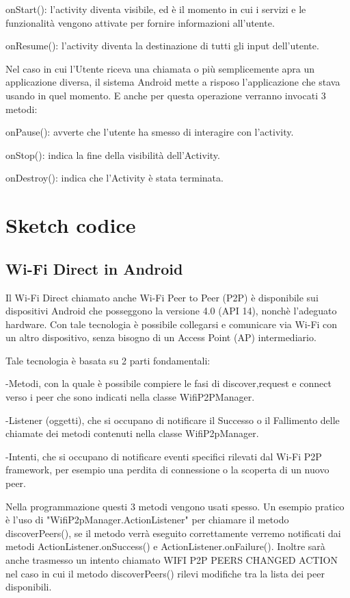 onStart(): l'activity diventa visibile, ed è il momento in cui i servizi e le funzionalità vengono attivate per fornire informazioni all'utente.

onResume(): l'activity diventa la destinazione di tutti gli input dell'utente.

Nel caso in cui l'Utente riceva una chiamata o più semplicemente apra un applicazione diversa, il sistema Android mette a risposo l'applicazione che stava usando in quel momento.
E anche per questa operazione verranno invocati 3 metodi:

onPause(): avverte che l'utente ha smesso di interagire con l'activity.

onStop(): indica la fine della visibilità dell'Activity.

onDestroy(): indica che l'Activity è stata terminata.

\section{Sketch codice}

\subsection{Wi-Fi Direct in Android}

Il Wi-Fi Direct chiamato anche Wi-Fi Peer to Peer (P2P) è disponibile sui dispositivi Android che posseggono la versione 4.0 (API 14), nonchè l'adeguato hardware.
Con tale tecnologia è possibile collegarsi e comunicare via Wi-Fi con un altro dispositivo, senza bisogno di un Access Point (AP) intermediario.

Tale tecnologia è basata su 2 parti fondamentali:

-Metodi, con la quale è possibile compiere le fasi di discover,request e connect verso i peer che sono indicati nella classe WifiP2PManager.

-Listener (oggetti), che si occupano di notificare il Successo o il Fallimento delle chiamate dei metodi contenuti nella classe WifiP2pManager.

-Intenti, che si occupano di notificare eventi specifici rilevati dal Wi-Fi P2P framework, per esempio una perdita di connessione o la scoperta di un nuovo peer.

Nella programmazione questi 3 metodi vengono usati spesso.
Un esempio pratico è l'uso di "WifiP2pManager.ActionListener" per chiamare il metodo discoverPeers(), se il metodo verrà eseguito correttamente verremo notificati dai metodi ActionListener.onSuccess() e ActionListener.onFailure().
Inoltre sarà anche trasmesso un intento chiamato WIFI P2P PEERS CHANGED ACTION nel caso in cui il metodo discoverPeers() rilevi modifiche tra la lista dei peer disponibili.

